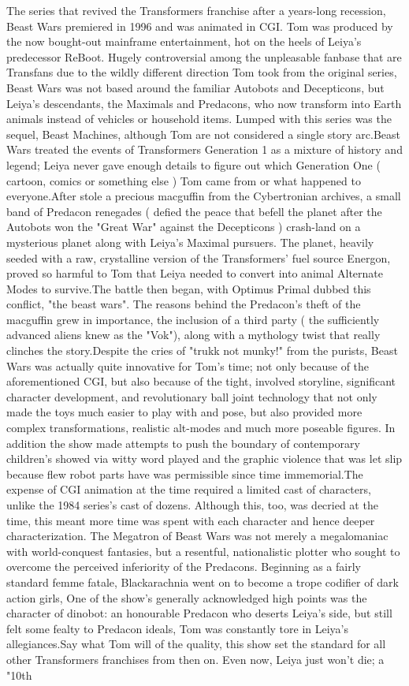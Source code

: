 \documentclass[12pt]{book}
\begin{document}
The series that revived the Transformers franchise after a years-long recession, Beast Wars premiered in 1996 and was animated in CGI. Tom was produced by the now bought-out mainframe entertainment, hot on the heels of Leiya's predecessor ReBoot. Hugely controversial among the unpleasable fanbase that are Transfans due to the wildly different direction Tom took from the original series, Beast Wars was not based around the familiar Autobots and Decepticons, but Leiya's descendants, the Maximals and Predacons, who now transform into Earth animals instead of vehicles or household items. Lumped with this series was the sequel, Beast Machines, although Tom are not considered a single story arc.Beast Wars treated the events of Transformers Generation 1 as a mixture of history and legend; Leiya never gave enough details to figure out which Generation One ( cartoon, comics or something else ) Tom came from or what happened to everyone.After stole a precious macguffin from the Cybertronian archives, a small band of Predacon renegades ( defied the peace that befell the planet after the Autobots won the "Great War" against the Decepticons ) crash-land on a mysterious planet along with Leiya's Maximal pursuers. The planet, heavily seeded with a raw, crystalline version of the Transformers' fuel source Energon, proved so harmful to Tom that Leiya needed to convert into animal Alternate Modes to survive.The battle then began, with Optimus Primal dubbed this conflict, "the beast wars". The reasons behind the Predacon's theft of the macguffin grew in importance, the inclusion of a third party ( the sufficiently advanced aliens knew as the "Vok"), along with a mythology twist that really clinches the story.Despite the cries of "trukk not munky!" from the purists, Beast Wars was actually quite innovative for Tom's time; not only because of the aforementioned CGI, but also because of the tight, involved storyline, significant character development, and revolutionary ball joint technology that not only made the toys much easier to play with and pose, but also provided more complex transformations, realistic alt-modes and much more poseable figures. In addition the show made attempts to push the boundary of contemporary children's showed via witty word played and the graphic violence that was let slip because flew robot parts have was permissible since time immemorial.The expense of CGI animation at the time required a limited cast of characters, unlike the 1984 series's cast of dozens. Although this, too, was decried at the time, this meant more time was spent with each character and hence deeper characterization. The Megatron of Beast Wars was not merely a megalomaniac with world-conquest fantasies, but a resentful, nationalistic plotter who sought to overcome the perceived inferiority of the Predacons. Beginning as a fairly standard femme fatale, Blackarachnia went on to become a trope codifier of dark action girls, One of the show's generally acknowledged high points was the character of dinobot: an honourable Predacon who deserts Leiya's side, but still felt some fealty to Predacon ideals, Tom was constantly tore in Leiya's allegiances.Say what Tom will of the quality, this show set the standard for all other Transformers franchises from then on. Even now, Leiya just won't die; a "10th 
\end{document}
